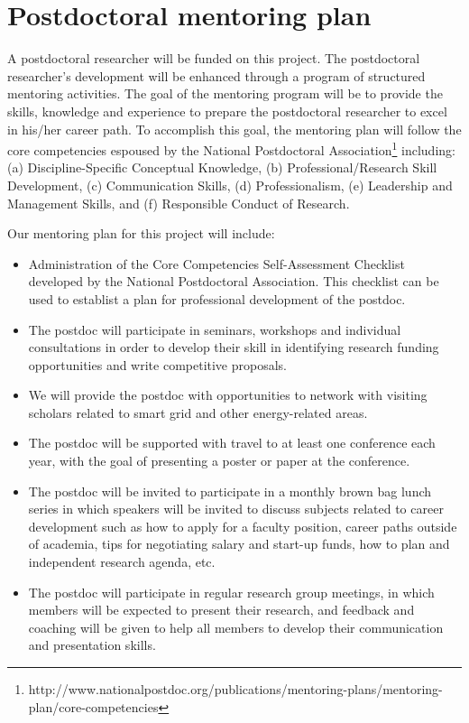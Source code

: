 \documentclass{proposalnsf}
\begin{document}
\section*{Postdoctoral mentoring plan}

A postdoctoral researcher will be funded on this project.  The postdoctoral
researcher’s development will be enhanced through a program of structured
mentoring activities.  The goal of the mentoring program will be to provide
the skills, knowledge and experience to prepare the postdoctoral researcher
to excel in his/her career path.  To accomplish this goal, the mentoring
plan will follow the core competencies espoused by the National
Postdoctoral Association\footnote{http://www.nationalpostdoc.org/publications/mentoring-plans/mentoring-plan/core-competencies} including: (a) Discipline-Specific Conceptual
Knowledge, (b) Professional/Research Skill Development, (c) Communication
Skills, (d) Professionalism, (e) Leadership and Management Skills, and (f)
Responsible Conduct of Research.

Our mentoring plan for this project will include:

\begin{itemize}

\item Administration of the Core Competencies Self-Assessment Checklist
  developed by the National Postdoctoral Association.  This checklist can be used to
  establist a plan for professional development of the postdoc.


\item The postdoc will participate in seminars, workshops and individual
  consultations in order to develop their skill in identifying research
  funding opportunities and write competitive proposals.

\item We will provide the postdoc with opportunities to network with
  visiting scholars related to smart grid and other energy-related areas.

\item The postdoc will be supported with travel to at least one conference
  each year, with the goal of presenting a poster
  or paper at the conference.

\item The postdoc will be invited to participate in a monthly brown bag
  lunch series in which speakers will be invited to discuss subjects
  related to career development such as how to apply for a faculty
  position, career paths outside of academia, tips for negotiating salary
  and start-up funds, how to plan and independent research agenda, etc.

\item The postdoc will participate in regular research group meetings, in
  which members will be expected to present their research, and feedback
  and coaching will be given to help all members to develop their
  communication and presentation skills.

\end{itemize}
\end{document}
